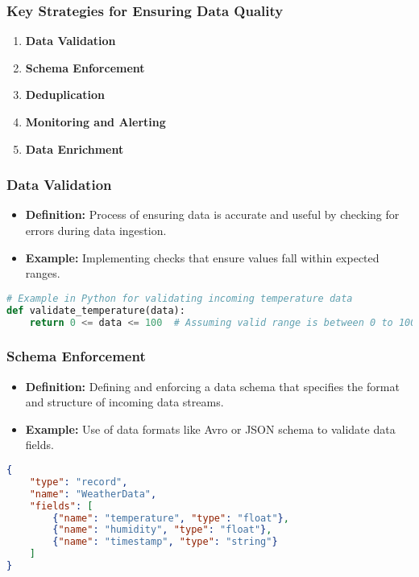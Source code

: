 \documentclass[aspectratio=169]{beamer}
\begin{document}
\begin{frame}
    \frametitle{Key Strategies for Ensuring Data Quality}
    \begin{enumerate}
        \item \textbf{Data Validation}
        \item \textbf{Schema Enforcement}
        \item \textbf{Deduplication}
        \item \textbf{Monitoring and Alerting}
        \item \textbf{Data Enrichment}
    \end{enumerate}
\end{frame}

\begin{frame}[fragile]
    \frametitle{Data Validation}
    \begin{itemize}
        \item \textbf{Definition:} Process of ensuring data is accurate and useful by checking for errors during data ingestion.
        \item \textbf{Example:} Implementing checks that ensure values fall within expected ranges.
    \end{itemize}
    \begin{lstlisting}[language=Python]
# Example in Python for validating incoming temperature data
def validate_temperature(data):
    return 0 <= data <= 100  # Assuming valid range is between 0 to 100
    \end{lstlisting}
\end{frame}

\begin{frame}[fragile]
    \frametitle{Schema Enforcement}
    \begin{itemize}
        \item \textbf{Definition:} Defining and enforcing a data schema that specifies the format and structure of incoming data streams.
        \item \textbf{Example:} Use of data formats like Avro or JSON schema to validate data fields.
    \end{itemize}
    \begin{lstlisting}[language=json]
{
    "type": "record",
    "name": "WeatherData",
    "fields": [
        {"name": "temperature", "type": "float"},
        {"name": "humidity", "type": "float"},
        {"name": "timestamp", "type": "string"}
    ]
}
    \end{lstlisting}
\end{frame}
\end{document}
